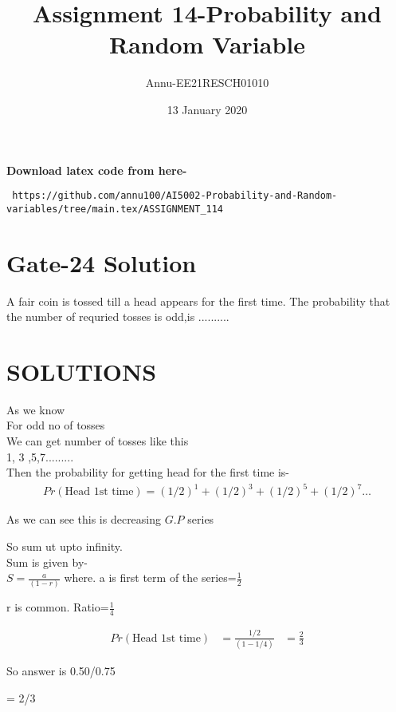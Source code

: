 \documentclass[journel,12pt,twocoloums]{IEEEtran}
\title{Assignment 14-Probability and Random Variable}
\author{Annu-EE21RESCH01010}
\date{13 January 2020}
\begin{document}
 \maketitle
\textbf{Download latex code from here-}\\
\begin{lstlisting}
 https://github.com/annu100/AI5002-Probability-and-Random-variables/tree/main.tex/ASSIGNMENT_114
 \end{lstlisting}

 \section{Gate-24 Solution}
\begin{flushleft}
A fair coin is tossed till a head appears for the
first time. The probability that the number of
requried tosses is odd,is ..........

\section{SOLUTIONS}
As we know\\
For odd no of tosses\\

We can get number of tosses like this\\

1, 3 ,5,7.........\\
Then the probability for getting head for the first time is-\\
\begin{align}
Pr(\text{Head 1st time})=(1/2)^1+ (1/2)^3 +(1/2)^5 +(1/2)^7 \ldots 
\end{align}

As we can see this is decreasing $G.P$ series

So sum ut upto infinity.\\
Sum is given by-\\
$S=\frac{a}{(1-r)}$
where.
a is first term of the series=$\frac{1}{2}$

r is common. Ratio=$\frac{1}{4}$
\end{flushleft}
\begin{align}
    Pr(\text{Head 1st time})&=\frac{1/2}{(1-1/4)}
                     &=\frac{2}{3}
\end{align}

So answer is 0.50/0.75

= 2/3
\end{document}
